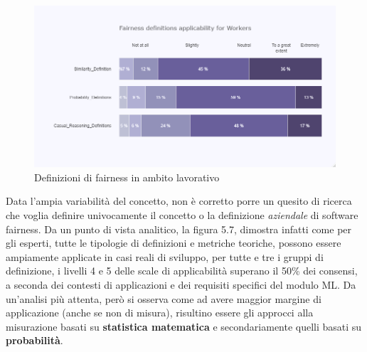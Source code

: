     \begin{center}
			\hspace*{-5mm}%
	\end{center}
    
     \begin{figure}[h!]
        \centering
        \includegraphics[width=1\textwidth]{figure/Analisi/RQ1/Hist_Fairness_Deginitions_Applicability.png}
        \caption{Definizioni di fairness in ambito lavorativo}
    \end{figure}
    
    Data l'ampia variabilità del concetto, non è corretto porre un quesito di ricerca che voglia definire univocamente il concetto o la definizione \emph{aziendale} di software fairness. Da un punto di vista analitico, la figura 5.7, dimostra infatti come per gli esperti, tutte le tipologie di definizioni e metriche teoriche, possono essere ampiamente applicate in casi reali di sviluppo, per tutte e tre i gruppi di definizione, i livelli 4 e 5 delle scale di applicabilità superano il 50\% dei consensi, a seconda dei contesti di applicazioni e dei requisiti specifici del modulo ML. Da un'analisi più attenta, però si osserva come ad avere maggior margine di applicazione (anche se non di misura), risultino essere gli approcci alla misurazione basati su \textbf{statistica matematica} e secondariamente quelli basati su \textbf{probabilità}.  
    
